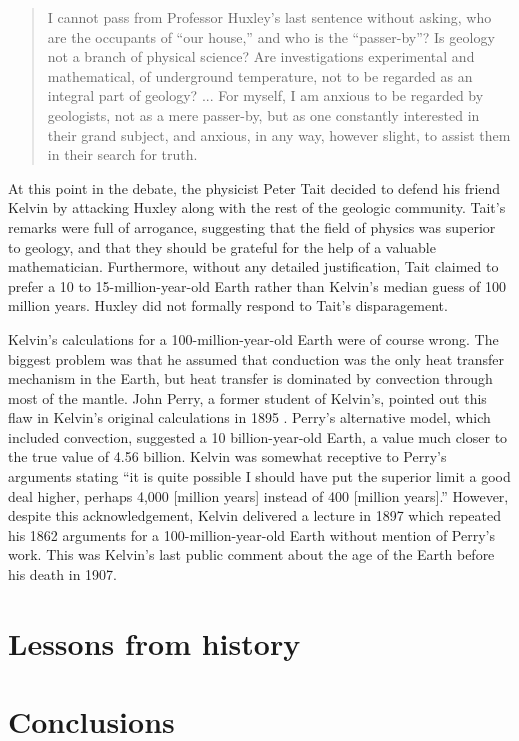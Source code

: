 \documentclass[12pt]{article}
\begin{document}
\begin{quote}
  I cannot pass from Professor Huxley's last sentence without asking, who are the occupants of ``our house,'' and who is the ``passer-by''? Is geology not a branch of physical science? Are investigations experimental and mathematical, of underground temperature, not to be regarded as an integral part of geology? ... For myself, I am anxious to be regarded by geologists, not as a mere passer-by, but as one constantly interested in their grand subject, and anxious, in any way, however slight, to assist them in their search for truth.
\end{quote}

At this point in the debate, the physicist Peter Tait decided to defend his friend Kelvin by attacking Huxley along with the rest of the geologic community. Tait's remarks were full of arrogance, suggesting that the field of physics was superior to geology, and that they should be grateful for the help of a valuable mathematician. Furthermore, without any detailed justification, Tait claimed to prefer a 10 to 15-million-year-old Earth rather than Kelvin's median guess of 100 million years. Huxley did not formally respond to Tait's disparagement.

Kelvin's calculations for a 100-million-year-old Earth were of course wrong. The biggest problem was that he assumed that conduction was the only heat transfer mechanism in the Earth, but heat transfer is dominated by convection through most of the mantle. John Perry, a former student of Kelvin's, pointed out this flaw in Kelvin's original calculations in 1895 \citep{England_2007}. Perry's alternative model, which included convection, suggested a 10 billion-year-old Earth, a value much closer to the true value of 4.56 billion. Kelvin was somewhat receptive to Perry's arguments stating ``it is quite possible I should have put the superior limit a good deal higher, perhaps 4,000 [million years] instead of 400 [million years].'' However, despite this acknowledgement, Kelvin delivered a lecture in 1897 which repeated his 1862 arguments for a 100-million-year-old Earth without mention of Perry's work. This was Kelvin's last public comment about the age of the Earth before his death in 1907.

\section{Lessons from history}

\section{Conclusions}



\end{document}
